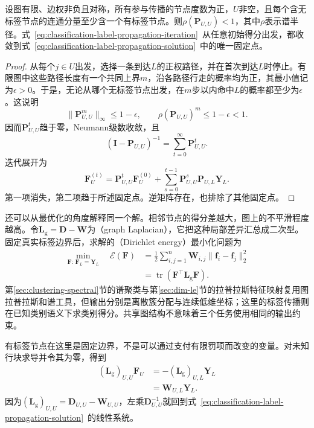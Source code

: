 \begin{theorem}[硬钳制传播的唯一解]
  \label{thm:classification-label-propagation-convergence}
  设图有限、边权非负且对称，所有参与传播的节点度数为正，$U$非空，且每个含无标签节点的连通分量至少含一个有标签节点。则$\rho(\bm{P}_{U,U})<1$，其中$\rho$表示谱半径。式~\eqref{eq:classification-label-propagation-iteration}~从任意初始得分出发，都收敛到式~\eqref{eq:classification-label-propagation-solution}~中的唯一固定点。
\end{theorem}

\begin{proof}
  从每个$j\in U$出发，选择一条到达$L$的正权路径，并在首次到达$L$时停止。有限图中这些路径长度有一个共同上界$m$，沿各路径行走的概率均为正，其最小值记为$\epsilon>0$。于是，无论从哪个无标签节点出发，在$m$步以内命中$L$的概率都至少为$\epsilon$。这说明
  \[
    \lVert\bm{P}_{U,U}^{m}\rVert_\infty\leq1-\epsilon,
    \qquad
    \rho(\bm{P}_{U,U})^m\leq1-\epsilon<1.
  \]
  因而$\bm{P}_{U,U}^t$趋于零，Neumann级数收敛，且
  \[
    (\bm{I}-\bm{P}_{U,U})^{-1}
      =\sum_{t=0}^{\infty}\bm{P}_{U,U}^{t}.
  \]
  迭代展开为
  \[
    \bm{F}_U^{(t)}
      =\bm{P}_{U,U}^{t}\bm{F}_U^{(0)}
       +\sum_{s=0}^{t-1}
         \bm{P}_{U,U}^{s}\bm{P}_{U,L}\bm{Y}_L.
  \]
  第一项消失，第二项趋于所述固定点。逆矩阵存在，也排除了其他固定点。
\end{proof}

还可以从最优化的角度解释同一个解。相邻节点的得分差越大，图上的不平滑程度越高。令$\bm{L}_{\mathrm{g}}=\bm{D}-\bm{W}$为（graph Laplacian），它把这种局部差异汇总成二次型。固定真实标签边界后，求解的（Dirichlet energy）最小化问题为
\begin{equation}
  \label{eq:classification-label-propagation-energy}
  \begin{aligned}
    \min_{\bm{F}:\,\bm{F}_L=\bm{Y}_L}\quad
    \mathcal{E}(\bm{F})
      &=\frac12\sum_{i,j=1}^{n}
        \bm{W}_{i,j}\lVert\bm{f}_i-\bm{f}_j\rVert_2^2\\
      &=\operatorname{tr}
        (\bm{F}^{\top}\bm{L}_{\mathrm{g}}\bm{F}).
  \end{aligned}
\end{equation}
第\ref{sec:clustering-spectral}节的谱聚类与第\ref{sec:dim-le}节的拉普拉斯特征映射复用图拉普拉斯和谱工具，但输出分别是离散簇分配与连续低维坐标；这里的标签传播则在已知类别语义下求类别得分。共享图结构不意味着三个任务使用相同的输出约束。

有标签节点在这里是固定边界，不是可以通过支付有限罚项而改变的变量。对未知行块求导并令其为零，得到
\begin{equation}
  \label{eq:classification-label-propagation-dirichlet}
  \begin{aligned}
    (\bm{L}_{\mathrm{g}})_{U,U}\bm{F}_U
      &=-(\bm{L}_{\mathrm{g}})_{U,L}\bm{Y}_L\\
      &=\bm{W}_{U,L}\bm{Y}_L.
  \end{aligned}
\end{equation}
因为$(\bm{L}_{\mathrm{g}})_{U,U}=\bm{D}_{U,U}-\bm{W}_{U,U}$，左乘$\bm{D}_{U,U}^{-1}$就回到式~\eqref{eq:classification-label-propagation-solution}~的线性系统。

